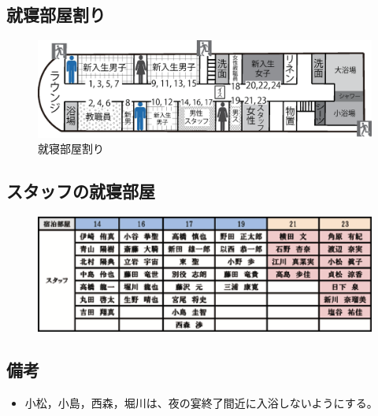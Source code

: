 \subsection{就寝部屋割り}
\begin{figure}[H]
\begin{center}
\includegraphics[scale=0.6]{./10/syushin.eps}
\vspace{-45mm}
\caption{就寝部屋割り}
\label{fig:futon_katazuke}
\end{center}
\end{figure}

\subsection{スタッフの就寝部屋}
\begin{figure}[H]
\begin{center}
\includegraphics[scale=0.9]{./10/room.eps}
\end{center}
\end{figure}

\subsection{備考}
\begin{itemize}
\item 小松，小島，西森，堀川は、夜の宴終了間近に入浴しないようにする。
\end{itemize}

